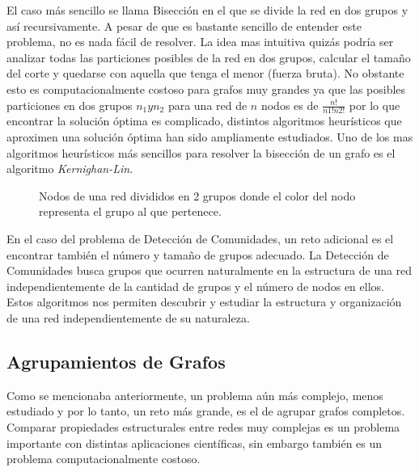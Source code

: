 El caso más sencillo se llama Bisección en el que se divide la red en dos grupos y así recursivamente. A pesar de que es bastante sencillo de entender este problema, no es nada fácil de resolver. La idea mas intuitiva quizás podría ser analizar todas las particiones posibles de la red en dos grupos, calcular el tamaño del corte y quedarse con aquella que tenga el menor (fuerza bruta). No obstante esto es computacionalmente costoso para grafos muy grandes ya que las posibles particiones en dos grupos $n_1 y n_2$ para una red de $n$ nodos es de $\frac{n!}{n1!n2!}$ \cite{newman_networks_2010} por lo que encontrar la solución óptima es complicado, distintos algoritmos heurísticos que aproximen una solución óptima han sido ampliamente estudiados. Uno de los mas algoritmos heurísticos más sencillos para resolver la bisección de un grafo es el algoritmo \textit{Kernighan-Lin}.

 \begin{figure}[htbp]
   \centering
   
    \caption{Nodos de una red divididos en 2 grupos donde el color del nodo representa el grupo al que pertenece.}
    \label{fig:partition}
\end{figure}

En el caso del problema de Detección de Comunidades, un reto adicional es el encontrar también el número y tamaño de grupos adecuado. La Detección de Comunidades busca grupos que ocurren naturalmente en la estructura de una red independientemente de la cantidad de grupos y el número de nodos en ellos. Estos algoritmos nos permiten descubrir y estudiar la estructura y organización de una red independientemente de su naturaleza.

\subsection{Agrupamientos de Grafos}

Como se mencionaba anteriormente, un problema aún más complejo, menos estudiado y por lo tanto, un reto más grande, es el de agrupar grafos completos. Comparar propiedades estructurales entre redes muy complejas es un problema importante con distintas aplicaciones científicas, sin embargo también es un problema computacionalmente costoso.

 \begin{figure}[htbp]
   \centering
   
    \caption{}
    \label{fig:netcluster}
\end{figure}


